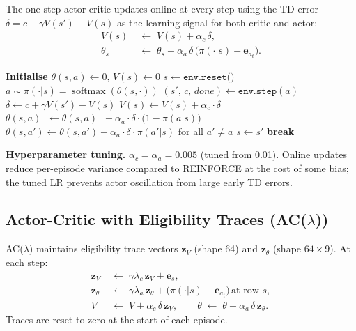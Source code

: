 \documentclass[11pt]{article}
\begin{document}
The one-step actor-critic updates online at every step using the TD error
$\delta = c + \gamma V(s') - V(s)$ as the learning signal for both critic
and actor:
\begin{align}
    V(s) &\;\leftarrow\; V(s) + \alpha_c\,\delta,\\
    \theta_s &\;\leftarrow\; \theta_s + \alpha_a\,\delta\,\bigl(\pi(\cdot|s) - \mathbf{e}_{a_t}\bigr).
\end{align}

\begin{algorithm}[H]
\caption{One-Step Actor-Critic}
\label{alg:ac_onestep}
\begin{algorithmic}[1]
\State \textbf{Initialise} $\theta(s,a)\leftarrow 0$,\; $V(s)\leftarrow 0$
    \State $s \leftarrow \texttt{env.reset()}$
        \State $a \sim \pi(\cdot|s) = \operatorname{softmax}(\theta(s,\cdot))$
        \State $(s',\, c,\, \textit{done}) \leftarrow \texttt{env.step}(a)$
        \State $\delta \leftarrow c + \gamma V(s') - V(s)$ 
        \State $V(s) \leftarrow V(s) + \alpha_c\cdot\delta$ 
        \State $\theta(s,a)\;\; \leftarrow \theta(s,a)\;\; + \alpha_a\cdot\delta\cdot\bigl(1-\pi(a|s)\bigr)$
        \State $\theta(s,a') \leftarrow \theta(s,a') - \alpha_a\cdot\delta\cdot\pi(a'|s)$
               \hfill for all $a'\neq a$ 
        \State $s \leftarrow s'$
         \textbf{break} \EndIf
    \EndFor
\EndFor
\end{algorithmic}
\end{algorithm}

\textbf{Hyperparameter tuning.}  $\alpha_c = \alpha_a = 0.005$ (tuned from 0.01).
Online updates reduce per-episode variance compared to REINFORCE at the cost of
some bias; the tuned LR prevents actor oscillation from large early TD errors.

\subsection{Actor-Critic with Eligibility Traces (AC($\lambda$))}

AC($\lambda$) maintains eligibility trace vectors $\mathbf{z}_V$ (shape 64)
and $\mathbf{z}_\theta$ (shape $64\times9$).  At each step:
\begin{align}
    \mathbf{z}_V &\;\leftarrow\; \gamma\lambda_c\,\mathbf{z}_V + \mathbf{e}_s,\\
    \mathbf{z}_\theta &\;\leftarrow\; \gamma\lambda_a\,\mathbf{z}_\theta
        + \bigl(\pi(\cdot|s)-\mathbf{e}_{a_t}\bigr)\,\text{at row }s,\\
    V &\;\leftarrow\; V + \alpha_c\,\delta\,\mathbf{z}_V,\qquad
    \theta \;\leftarrow\; \theta + \alpha_a\,\delta\,\mathbf{z}_\theta.
\end{align}
Traces are reset to zero at the start of each episode.
\end{document}
